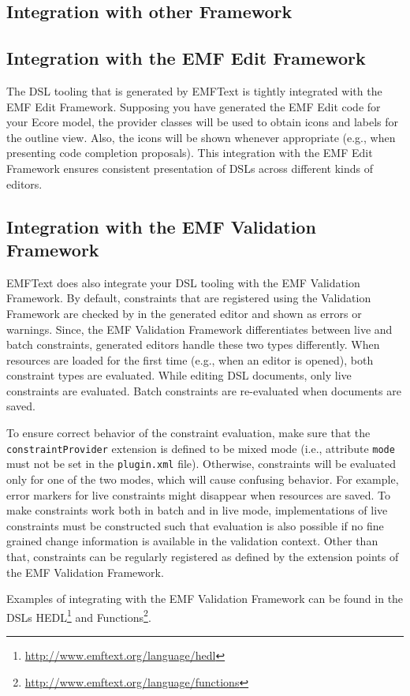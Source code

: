 \subsection{Integration with other Framework}

\subsection{Integration with the EMF Edit Framework}

The DSL tooling that is generated by EMFText is tightly integrated with the EMF
Edit Framework. Supposing you have generated the EMF Edit code for your Ecore 
model, the provider classes will be used to obtain icons and labels for the 
outline view. Also, the icons will be shown whenever appropriate (e.g., when
presenting code completion proposals). This integration with the EMF Edit 
Framework ensures consistent presentation of DSLs across different kinds of
editors.

\subsection{Integration with the EMF Validation Framework}

EMFText does also integrate your DSL tooling with the EMF Validation Framework.
By default, constraints that are registered using the Validation Framework are
checked by in the generated editor and shown as errors or warnings. Since, the
EMF Validation Framework differentiates between live and batch constraints,
generated editors handle these two types differently. When resources are loaded
for the first time (e.g., when an editor is opened), both constraint types are
evaluated. While editing DSL documents, only live constraints are evaluated.
Batch constraints are re-evaluated when documents are saved.

To ensure correct behavior of the constraint evaluation, make sure that the 
\texttt{constraintProvider} extension is defined to be mixed mode (i.e., 
attribute \texttt{mode} must not be set in the \texttt{plugin.xml} file). 
Otherwise, constraints will be evaluated only for one of the two modes, which 
will cause confusing behavior. For example, error markers for live constraints
might disappear when resources are saved. To make constraints work both in batch
and in live mode, implementations of live constraints must be constructed such 
that evaluation is also possible if no fine grained change information is 
available in the validation context. Other than that, constraints can be
regularly registered as defined by the extension points of the EMF Validation 
Framework.

Examples of integrating with the EMF Validation Framework can be found in
the DSLs HEDL\footnote{\url{http://www.emftext.org/language/hedl}} and 
Functions\footnote{\url{http://www.emftext.org/language/functions}}. 
